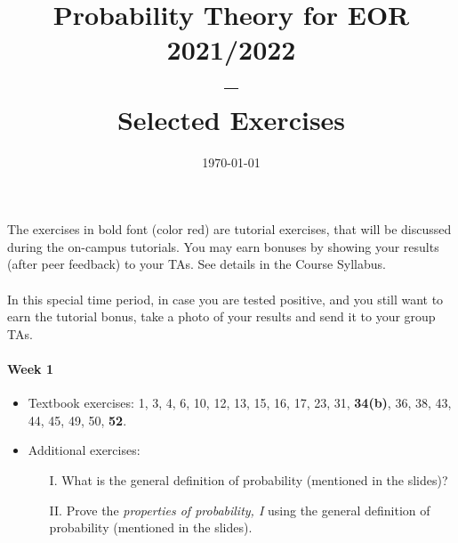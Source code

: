 \documentclass[12pt,english]{exam}
\title{Probability Theory for EOR 2021/2022\\
--\\
Selected Exercises\\}
\date{\today}
\begin{document}
	\maketitle
The exercises in bold font (color red) are tutorial exercises, that will be discussed during the on-campus tutorials. You may earn bonuses by showing your results (after peer feedback) to your TAs. See details in the Course Syllabus. \\~\\
In this special time period, in case you are tested positive, and you still want to earn the tutorial bonus, take a photo of your results and send it to your group TAs. 
\paragraph{Week 1} 
\begin{itemize}
	\item Textbook exercises: 1, 3, 4, 6, 10, 12, 13, 15, 16, 17, 23, 31, \textbf{\color{red} 34(b)}, 36, 38, 43, 44, 45, 49, 50, \textbf{\color{red} 52}.
	\item Additional exercises:
	\begin{itemize}
		\item[I.] What is the general definition of probability (mentioned in the slides)?
		\item[II.] Prove the \textit{properties of probability, I} using the general definition of probability (mentioned in the slides).   
	\end{itemize}
\end{itemize}
 
\end{document}

